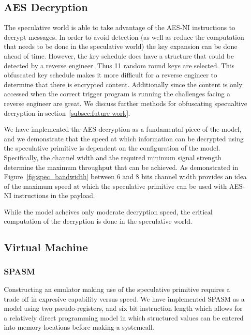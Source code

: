
\subsection{AES Decryption}
\label{subsec:impl-aes}
The speculative world is able to take advantage of the AES-NI instructions to
decrypt messages. In order to avoid detection (as well as reduce the computation
that needs to be done in the speculative world) the key expansion can be done
ahead of time. However, the key schedule does have a structure that could be
detected by a reverse engineer. Thus 11 random round keys are selected. This
obfuscated key schedule makes it more difficult for a reverse engineer to
determine that there is encrypted content. Additionally since the content is
only accessed when the correct trigger program is running the challenges facing
a reverse engineer are great. We discuss further methods for obfuscating
specualtive decryption in section~\ref{subsec:future-work}. 


We have implemented the AES decryption as a fundamental piece of the \speculake model,
and we demonstrate that the speed at which information can be decrypted using the speculative 
primitive is dependent on the configuration of the \speculake model. Specifically,
the channel width and the required minimum signal strength determine the maximum
throughput that can be achieved. As demonstrated in Figure~\ref{fig:spec_bandwidth} 
between 6 and 8 bits channel width provides an idea of the maximum speed at which the 
speculative primitive can be used with AES-NI instructions in the payload. 

While the \speculake model acheives only moderate decryption speed, the 
critical computation of the decryption is done in the speculative world. 

\FigSpecBandwidth

\subsection{Virtual Machine}


\subsubsection{SPASM}
\label{subsubsec:spasm}
Constructing an emulator making use of the speculative primitive requires  
a trade off in expresive capability versus speed. 
We have implemented SPASM as a model using two pseudo-registers, and six 
bit instruction length which allows for a relatively direct programming model 
in which structured values can be entered into memory locations before making 
a systemcall.

